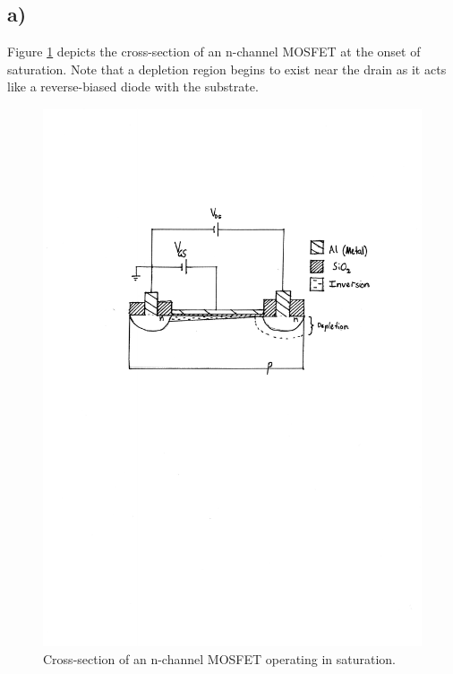 \subsection*{a)}
Figure \ref{fig::4a} depicts the cross-section of an n-channel MOSFET at the onset of saturation. Note that a depletion region begins to exist near the drain as it acts like a reverse-biased diode with the substrate.
	\begin{figure}[htbp!]
		\flushright
		\includegraphics[trim={4cm 15cm 2.9cm 5cm},clip]{./img/4a}
		\caption{Cross-section of an n-channel MOSFET operating in saturation.}
		\label{fig::4a}
	\end{figure}
